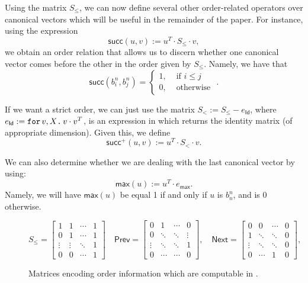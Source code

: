 %

Using the matrix $S_\leq$, we can now define several other order-related operators over canonical vectors which will be useful in the remainder of the paper. For instance, using the expression 
$$
\mathsf{succ}(u,v) := u^T\cdot S_{\leq} \cdot v,
$$
we obtain an order relation that allows us to discern whether one canonical vector comes before 
the other in the order given by $S_{\leq}$. Namely, we have that $$\mathsf{succ}(b_i^n,b_j^n) = \begin{cases}
1, & \text{ if } i\leq j\\
0, & \text{ otherwise }
\end{cases}.$$


If we want a strict order, we can just use the matrix
$S_< := S_{\leq} - e_{\mathsf{Id}}$, where $e_{\mathsf{Id}} := \texttt{for}\, v,X \texttt{.}\, v\cdot v^T$, is an expression in \langfor which returns the identity matrix (of appropriate dimension). Given this, we define
$$\mathsf{succ}^+(u,v) := u^T\cdot S_{<} \cdot v.$$

We can also determine whether we are dealing with the last canonical vector by using:
$$
\mathsf{max}(u):=u^T\cdot e_{\mathsf{max}}.
$$
Namely, we will have $\mathsf{max}(u)$ be equal 1 if and only if $u$ is $b_n^n$, and is 0 otherwise.

\begin{figure}
	\[
	S_{\leq} = \begin{bmatrix}
		1 & 1 & \cdots &  1 \\
		0 & 1 & \cdots & 1\\
		\vdots & \vdots & \ddots & 1 \\
		0 & 0 & \cdots & 1 
	\end{bmatrix} \quad\mathsf{Prev} = \begin{bmatrix}
		0 & 1 & \cdots &  0 \\
		0 & \ddots & \ddots & \vdots \\
		\vdots & \ddots & \ddots& 1 \\
		0 & \cdots & \cdots & 0
	\end{bmatrix},
	\quad \mathsf{Next} = \begin{bmatrix}
		0 & 0 & \cdots &  0 \\
		1 & \ddots & \ddots & 0\\
		\vdots & \ddots & \ddots &0 \\
		0 & \cdots & 1 & 0
	\end{bmatrix},
	\] 
	\caption{Matrices encoding order information which are computable in \langfor.}\label{fig:ordermat}
\end{figure}


